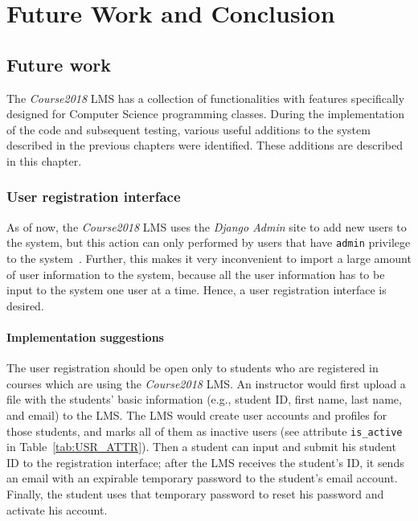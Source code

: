 

\chapter{Future Work and Conclusion}
\label{chap:FUTURE}

\section{Future work}
The \emph{Course2018} LMS has a collection of functionalities 
with features specifically designed for Computer Science programming
classes.
During the implementation of the code and subsequent testing,
various useful additions to the system
described in the previous chapters were identified.
These additions are described in this chapter.

\subsection{User registration interface}
As of now, the \emph{Course2018} LMS uses the \emph{Django Admin} site to
add new users to the system, but this action can only performed by users that
have \texttt{admin} privilege to the system~\cite{AdjangoAdmin}.
Further, this
makes it very inconvenient to import a large amount of user information to
the system, because all the user information has to be input to the system one
user at a time. Hence, a user registration interface is desired.

\subsubsection{Implementation suggestions}
The user registration should be open only to students
who are registered in courses which are using the \emph{Course2018} LMS\null.
An instructor would first upload a file with the students' basic information
(e.g., student ID, first name, last name, and email) to the LMS\null. The LMS would
create user accounts and profiles for those students, and marks all of them
as inactive users (see attribute \texttt{is\_active} in
Table~\ref{tab:USR_ATTR}).
Then a student can input and submit his student ID to the registration
interface; after the LMS receives the student's ID,
it sends an email with an expirable temporary password to the student's
email account.
Finally, the student uses that temporary password to reset his password and
activate his account.

